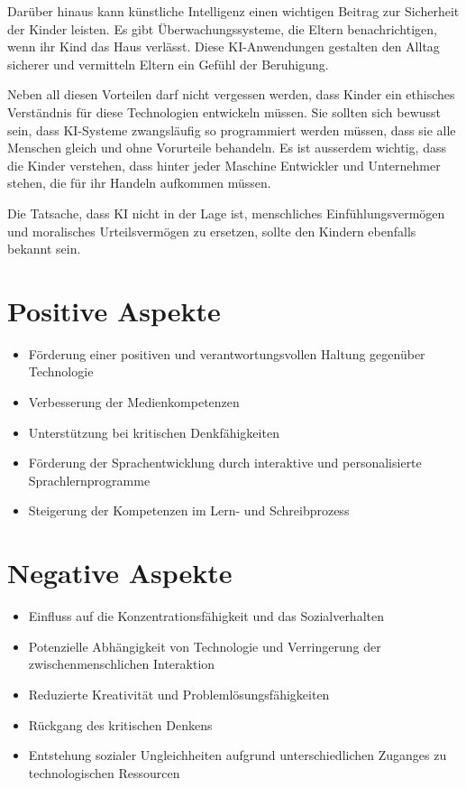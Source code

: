 \documentclass{article}
\begin{document}
Darüber hinaus kann künstliche Intelligenz einen wichtigen Beitrag zur Sicherheit der Kinder leisten. Es gibt Überwachungssysteme, die Eltern benachrichtigen, wenn ihr Kind das Haus verlässt. Diese KI-Anwendungen gestalten den Alltag sicherer und vermitteln Eltern ein Gefühl der Beruhigung. 

Neben all diesen Vorteilen darf nicht vergessen werden, dass Kinder ein ethisches Verständnis für diese Technologien entwickeln müssen. Sie sollten sich bewusst sein, dass KI-Systeme zwangsläufig so programmiert werden müssen, dass sie alle Menschen gleich und ohne Vorurteile behandeln. Es ist ausserdem wichtig, dass die Kinder verstehen, dass hinter jeder Maschine Entwickler und Unternehmer stehen, die für ihr Handeln aufkommen müssen.

Die Tatsache, dass KI nicht in der Lage ist, menschliches Einfühlungsvermögen und moralisches Urteilsvermögen zu ersetzen, sollte den Kindern ebenfalls bekannt sein. 

\section{Positive Aspekte}

\begin{itemize}

    \item Förderung einer positiven und verantwortungsvollen Haltung gegenüber Technologie
    \item Verbesserung der Medienkompetenzen
    \item Unterstützung bei kritischen Denkfähigkeiten
    \item Förderung der Sprachentwicklung durch interaktive und personalisierte Sprachlernprogramme
    \item Steigerung der Kompetenzen im Lern- und Schreibprozess

\end{itemize}

\section{Negative Aspekte}

\begin{itemize}

    \item Einfluss auf die Konzentrationsfähigkeit und das Sozialverhalten
    \item Potenzielle Abhängigkeit von Technologie und Verringerung der zwischenmenschlichen Interaktion
    \item Reduzierte Kreativität und Problemlösungsfähigkeiten
    \item Rückgang des kritischen Denkens
    \item Entstehung sozialer Ungleichheiten aufgrund unterschiedlichen Zuganges zu technologischen Ressourcen

\end{itemize}
\end{document}
